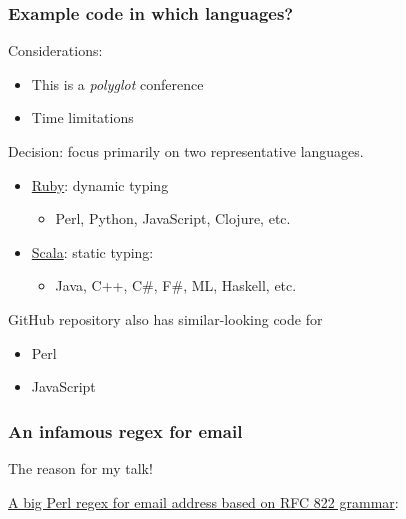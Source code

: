 \begin{frame}
  \frametitle{Example code in which languages?}

  Considerations:
  \begin{itemize}
    \item This is a \emph{polyglot} conference
    \item Time limitations
  \end{itemize}

  Decision: focus primarily on two representative languages.
  \begin{itemize}
    \item \href{http://www.ruby-lang.org/}{Ruby}: dynamic typing
      \begin{itemize}
        \item Perl, Python, JavaScript, Clojure, etc.
      \end{itemize}
    \item \href{http://www.scala-lang.org/}{Scala}: static typing: 
      \begin{itemize}
        \item Java, C++, C\#, F\#, ML, Haskell, etc.
      \end{itemize}
  \end{itemize}

  GitHub repository also has similar-looking code for
  \begin{itemize}
    \item Perl
    \item JavaScript
  \end{itemize}
\end{frame}

\begin{frame}[fragile]
  \frametitle{An infamous regex for email}

  The reason for my talk!

  \href{http://www.ex-parrot.com/pdw/Mail-RFC822-Address.html}{A big Perl regex for email address based on RFC 822 grammar}:

  \inputminted{text}{extra/rfc-822.pl}
\end{frame}

